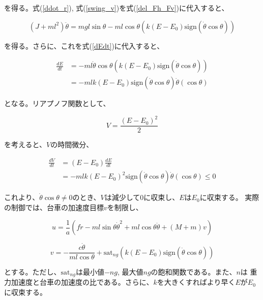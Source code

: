 を得る。式(\ref{ddot_r}), 式(\ref{swing_v})を式(\ref{del_Fh_Fv})に代入すると、

\begin{equation}
    (J + ml^2) \ddot{\theta} = mgl \sin{\theta}
                - ml \cos{\theta} (k(E - E_{0}) \mbox{sign} (\dot{\theta} \cos{\theta}))    
\end{equation}

を得る。さらに、これを式(\ref{dEdt})に代入すると、

\begin{equation*}
    \begin{split}
        \frac{dE}{dt} &= -ml \dot{\theta} \cos{\theta} (k(E - E_{0}) 
                            \mbox{sign} (\dot{\theta} \cos{\theta})) \\
                      &= -mlk(E - E_{0}) \mbox{sign} (\dot{\theta} \cos{\theta}) \dot{\theta} (\cos{\theta})
    \end{split}
\end{equation*}

となる。リアプノフ関数として、

\begin{equation}
    V = \frac{(E - E_{0})^2}{2}
\end{equation}

を考えると、$V$の時間微分、

\begin{equation}
    \begin{split}
        \frac{dV}{dt} &= (E - E_{0}) \frac{dE}{dt} \\
                      &= -mlk(E - E_{0})^2 \mbox{sign} (\dot{\theta} \cos{\theta}) \dot{\theta} (\cos{\theta}) \leq 0
    \end{split}
\end{equation}

これより、$\dot{\theta} \cos{\theta} \neq 0$のとき、$V$は減少して$0$に収束し、$E$は$E_{0}$に収束する。
実際の制御では、台車の加速度目標$v$を制限し、

$$
    u = \frac{1}{a}
        \left(
            f \dot{r} - ml \sin{\theta} \dot{\theta}^2 + ml \cos{\theta} \ddot{\theta}
            + (M + m)v
        \right)
$$

$$
    v = - \frac{c \dot{\theta}}{ml\cos{\theta}} 
        + \mbox{sat}_{ng} (k(E - E_{0}) \mbox{sign}(\dot{\theta}\cos{\theta}))
$$

とする。ただし、$\mbox{sat}_{ng}$は最小値$-ng$, 最大値$ng$の飽和関数である。また、$n$は
重力加速度と台車の加速度の比である。さらに、$k$を大きくすればより早く$E$が$E_{0}$に収束する。



